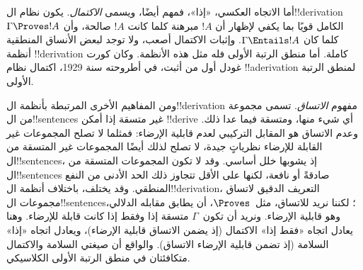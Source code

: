 \documentclass[../../../include/open-logic-section]{subfiles}
\begin{document}
أما الاتجاه العكسي، «إذا»، فمهم أيضًا، ويسمى \emph{الاكتمال}. يكون
نظام ال!!{derivation} الكامل قويًا بما يكفي لإظهار أن $!A$ مبرهنة
كلما كانت $!A$ صالحة، وأن $\Gamma \Proves !A$ كلما كان
$\Gamma \Entails !A$. وإثبات الاكتمال أصعب، ولا توجد لبعض الأنساق
المنطقية أنظمة !!{derivation} كاملة. أما منطق الرتبة الأولى فله مثل
هذه الأنظمة. وكان كورت غودل أول من أثبت، في أطروحته سنة 1929، اكتمال
نظام !!a{derivation} لمنطق الرتبة الأولى.

ومن المفاهيم الأخرى المرتبطة بأنظمة ال!!{derivation} مفهوم
\emph{الاتساق}. تسمى مجموعة من ال!!{sentence}s غير متسقة إذا أمكن
!!{derive} أي شيء منها، ومتسقة فيما عدا ذلك. وعدم الاتساق هو المقابل
التركيبي لعدم قابلية الإرضاء: فمثلما لا تصلح المجموعات غير القابلة
للإرضاء نظرياتٍ جيدة، لا تصلح لذلك أيضًا المجموعات غير المتسقة من
ال!!{sentence}s، إذ يشوبها خلل أساسي. وقد لا تكون المجموعات المتسقة
من ال!!{sentence}s صادقةً أو نافعة، لكنها على الأقل تتجاوز ذلك الحد
الأدنى من النفع المنطقي. وقد يختلف، باختلاف أنظمة ال!!{derivation}،
التعريف الدقيق لاتساق مجموعات ال!!{sentence}s؛ لكننا نريد للاتساق،
مثل~$\Proves$، أن يطابق مقابله الدلالي، وهو قابلية الإرضاء. ونريد أن
تكون~$\Gamma$ متسقة إذا وفقط إذا كانت قابلة للإرضاء. وهنا يعادل اتجاه
«فقط إذا» الاكتمال (إذ يضمن الاتساق قابلية الإرضاء)، ويعادل اتجاه
«إذا» السلامة (إذ تضمن قابلية الإرضاء الاتساق). والواقع أن صيغتي
السلامة والاكتمال متكافئتان في منطق الرتبة الأولى الكلاسيكي.
\end{document}
